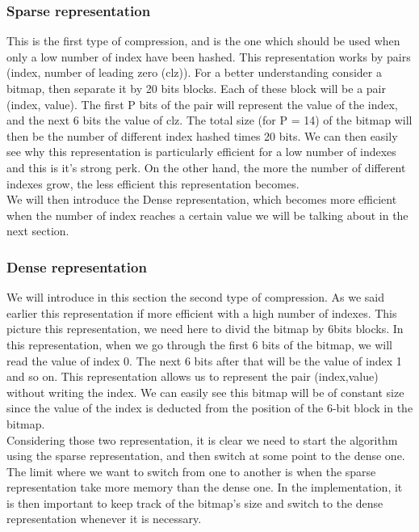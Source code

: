 \documentclass{article}
\begin{document}
\subsubsection{Sparse representation}
This is the first type of compression, and is the one which should be
used when only a low number of index have been hashed. This
representation works by pairs (index, number of leading zero
(clz)). For a better understanding consider a bitmap, then separate it
by 20 bits blocks. Each of these block will be a pair (index,
value). The first P bits of the pair will represent the value of the
index, and the next 6 bits the value of clz. The total size (for P =
14) of the bitmap will then be the number of different index hashed
times 20 bits. We can then easily see why this representation is
particularly efficient for a low number of indexes and this is it's
strong perk. On the other hand, the more the number of different
indexes grow, the less efficient this representation becomes. \\ We
will then introduce the Dense representation, which becomes more
efficient when the number of index reaches a certain value we will be
talking about in the next section.

\subsubsection{Dense representation}
We will introduce in this section the second type of compression. As
we said earlier this representation if more efficient with a high
number of indexes. This picture this representation, we need here to
divid the bitmap by 6bits blocks. In this representation, when we go
through the first 6 bits of the bitmap, we will read the value of
index 0. The next 6 bits after that will be the value of index 1 and
so on. This representation allows us to represent the pair
(index,value) without writing the index. We can easily see this bitmap
will be of constant size since the value of the index is deducted from
the position of the 6-bit block in the bitmap. \\ Considering those
two representation, it is clear we need to start the algorithm using
the sparse representation, and then switch at some point to the dense
one. The limit where we want to switch from one to another is when the
sparse representation take more memory than the dense one. In the
implementation, it is then important to keep track of the bitmap's
size and switch to the dense representation whenever it is necessary.
\end{document}
